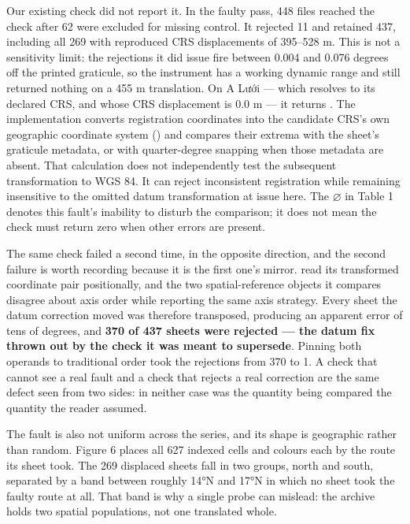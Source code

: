 \documentclass[11pt,a4paper]{article}
\begin{document}
Our existing \texttt{} check did not report it. In the faulty pass, 448 files reached the check after 62 were excluded for missing control. It rejected 11 and retained 437, including all 269 with reproduced CRS displacements of 395–528 m. This is not a sensitivity limit: the rejections it did issue fire between 0.004 and 0.076 degrees off the printed graticule, so the instrument has a working dynamic range and still returned nothing on a 455 m translation. On A Lưới — which \texttt{} resolves to its declared CRS, and whose CRS displacement is 0.0 m — it returns \texttt{}. The implementation converts registration coordinates into the candidate CRS's own geographic coordinate system (\texttt{}) and compares their extrema with the sheet's graticule metadata, or with quarter-degree snapping when those metadata are absent. That calculation does not independently test the subsequent transformation to WGS 84. It can reject inconsistent registration while remaining insensitive to the omitted datum transformation at issue here. The \ensuremath{\varnothing} in Table 1 denotes this fault's inability to disturb the comparison; it does not mean the check must return zero when other errors are present.

The same check failed a second time, in the opposite direction, and the second failure is worth recording because it is the first one's mirror. \texttt{} read its transformed coordinate pair positionally, and the two spatial-reference objects it compares disagree about axis order while reporting the same axis strategy. Every sheet the datum correction moved was therefore transposed, producing an apparent error of tens of degrees, and \textbf{370 of 437 sheets were rejected — the datum fix thrown out by the check it was meant to supersede}. Pinning both operands to traditional order took the rejections from 370 to 1. A check that cannot see a real fault and a check that rejects a real correction are the same defect seen from two sides: in neither case was the quantity being compared the quantity the reader assumed.

The fault is also not uniform across the series, and its shape is geographic rather than random. Figure 6 places all 627 indexed cells and colours each by the route its sheet took. The 269 displaced sheets fall in two groups, north and south, separated by a band between roughly 14°N and 17°N in which no sheet took the faulty route at all. That band is why a single probe can mislead: the archive holds two spatial populations, not one translated whole.
\end{document}
